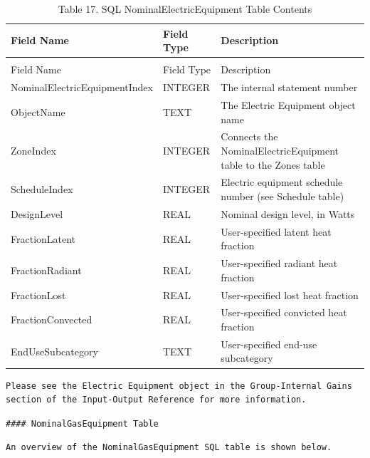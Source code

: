 \begin{longtable}[c]{p{1.5in}p{1.5in}p{2.99in}}
\caption{Table 17. SQL NominalElectricEquipment Table Contents \label{table:table-17.-sql-nominalelectricequipment-table}} \tabularnewline
\toprule 
Field Name & Field Type & Description \tabularnewline
\midrule
\endfirsthead

\caption[]{Table 17. SQL NominalElectricEquipment Table Contents} \tabularnewline
\toprule 
Field Name & Field Type & Description \tabularnewline
\midrule
\endhead

NominalElectricEquipmentIndex & INTEGER & The internal statement number \tabularnewline
ObjectName & TEXT & The Electric Equipment object name \tabularnewline
ZoneIndex & INTEGER & Connects the NominalElectricEquipment table to the Zones table \tabularnewline
ScheduleIndex & INTEGER & Electric equipment schedule number (see Schedule table) \tabularnewline
DesignLevel & REAL & Nominal design level, in Watts \tabularnewline
FractionLatent & REAL & User-specified latent heat fraction \tabularnewline
FractionRadiant & REAL & User-specified radiant heat fraction \tabularnewline
FractionLost & REAL & User-specified lost heat fraction \tabularnewline
FractionConvected & REAL & User-specified convicted heat fraction \tabularnewline
EndUseSubcategory & TEXT & User-specified end-use subcategory \tabularnewline
\bottomrule
\end{longtable}

\begin{lstlisting}
Please see the Electric Equipment object in the Group-Internal Gains section of the Input-Output Reference for more information.
\end{lstlisting}

\begin{lstlisting}
#### NominalGasEquipment Table
\end{lstlisting}

\begin{lstlisting}
An overview of the NominalGasEquipment SQL table is shown below.
\end{lstlisting}


